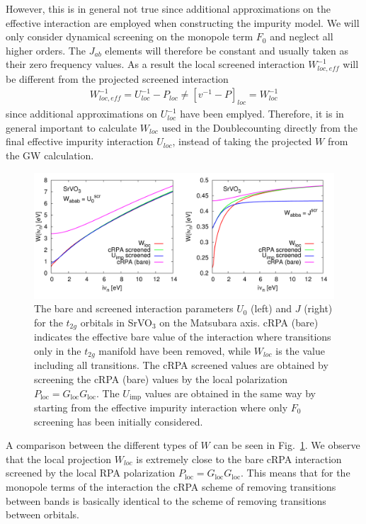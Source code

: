 \documentclass[12pt,a4paper]{scrartcl}
\numberwithin{equation}{section}
\begin{document}
However,
this is in general not true since additional approximations on the effective
interaction are employed when constructing the impurity model.
We will only consider dynamical screening on the monopole term $F_0$
and neglect all higher orders. The $J_{ab}$ elements will therefore be constant
and usually taken as their zero frequency values.
As a result the local screened interaction $W^{-1}_{loc,eff}$ will be different 
from the projected screened interaction
\begin{align}
W^{-1}_{loc,eff} =  U^{-1}_{loc} - P_{loc} \neq \left[ v^{-1} - P \right]_{loc} = W^{-1}_{loc} 
\end{align}
since additional approximations on $U^{-1}_{loc}$ have been emplyed.
Therefore, it is in general important to calculate $W_{loc}$ used in the Doublecounting
directly from the final effective impurity interaction $U_{loc}$,
instead of taking the projected $W$ from the GW calculation.

\begin{figure}[t]
\includegraphics[width=1.0\textwidth]{figs/Wloc/W_loc_comp.pdf}
\caption{The bare and screened interaction parameters $U_0$ (left) and $J$ (right)
for the $t_{2g}$ orbitals in SrVO$_3$ on the Matsubara axis. 
cRPA (bare) indicates the effective bare value of the interaction
where transitions only in the $t_{2g}$ manifold have been removed, while $W_{loc}$
is the value including all transitions.
The cRPA screened values are obtained by screening the cRPA (bare) values by the local
polarization $P_{\mathrm{loc}}=G_{\mathrm{loc}}G_{\mathrm{loc}}$.
The $U_{\mathrm{imp}}$ values are obtained in the same way by starting from the effective impurity interaction
where only $F_0$ screening has been initially considered.
}
\label{fig:W_loc_comparison}
\end{figure}

A comparison between the different types of $W$ can be seen in Fig.~\ref{fig:W_loc_comparison}.
We observe that the local projection $W_{loc}$ is extremely close to the
bare cRPA interaction screened by the local RPA polarization $P_{\mathrm{loc}}=G_{\mathrm{loc}}G_{\mathrm{loc}}$.
This means that for the monopole terms of the interaction
the cRPA scheme of removing transitions between bands is basically identical
to the scheme of removing transitions between orbitals.
\end{document}
